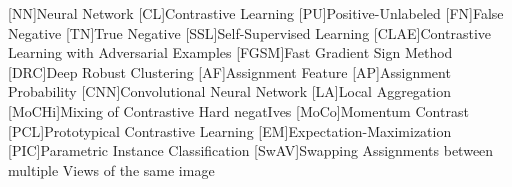 \begin{acronym}

    [NN]{Neural Network}
    [CL]{Contrastive Learning}
    [PU]{Positive-Unlabeled}
    [FN]{False Negative}
    [TN]{True Negative}
    [SSL]{Self-Supervised Learning}
    [CLAE]{Contrastive Learning with Adversarial Examples}
    [FGSM]{Fast Gradient Sign Method}
    [DRC]{Deep Robust Clustering}
    [AF]{Assignment Feature}
    [AP]{Assignment Probability}
    [CNN]{Convolutional Neural Network}
    [LA]{Local Aggregation}
    [MoCHi]{Mixing of Contrastive Hard negatIves}
    [MoCo]{Momentum Contrast}
    [PCL]{Prototypical Contrastive Learning}
    [EM]{Expectation-Maximization}
    [PIC]{Parametric Instance Classification}
    [SwAV]{Swapping Assignments between multiple Views of the same image}


\end{acronym}